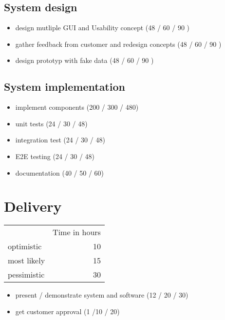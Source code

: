 \documentclass
[
 12pt, %
       DIV12,
       a4paper, %
       oneside, %
       titlepage, %
       parskip=half, %
       headings=normal, %
       listof=totoc, %
       bibliography=totoc, %
       index=totoc, %
       captions=tableheading, %
       ]{scrreprt}
\begin{document}
\section{System design}
\label{sec:org1137d7c}
\begin{itemize}
\item design mutliple GUI and Usability concept (48 / 60 / 90 )
\item gather feedback from customer and redesign concepts (48 / 60 / 90 )
\item design prototyp with fake data (48 / 60 / 90 )
\end{itemize}
\section{System implementation}
\label{sec:orgf2f809f}
\begin{itemize}
\item implement components (200 / 300 / 480)
\item unit tests (24 / 30 / 48)
\item integration test (24 / 30 / 48)
\item E2E testing (24 / 30 / 48)
\item documentation (40 / 50 / 60)
\end{itemize}



\chapter{Delivery}
\label{sec:org1388080}
\begin{center}
\begin{tabular}{lr}
 & Time in hours\\
optimistic & 10\\
most likely & 15\\
pessimistic & 30\\
\end{tabular}
\end{center}
\begin{itemize}
\item present / demonstrate system and software (12 / 20 / 30)
\item get customer approval (1 /10 / 20)
\end{itemize}
\end{document}

